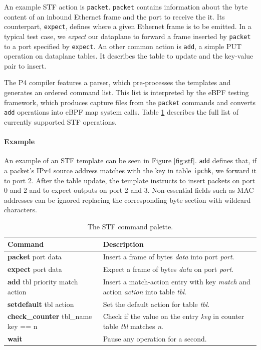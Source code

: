 An example STF action is \texttt{packet}. \texttt{packet} contains information 
about the byte content of an inbound Ethernet frame and the port to receive the 
it. Its counterpart, \texttt{expect}, defines where a given Ethernet frame is 
to be emitted. In a typical test case, we \textit{expect} our dataplane to 
forward a frame inserted by \texttt{packet} to a port specified by 
\texttt{expect}.
An other common action is \texttt{add}, a simple PUT operation 
on dataplane tables. It describes the table to update and the key-value pair 
to insert.

The P4 compiler features a parser, which pre-processes the templates and 
generates an ordered command list. This list is interpreted by the eBPF testing 
framework, which produces capture files from the \texttt{packet} commands and 
converts \texttt{add} operations into eBPF map system calls.
Table \ref{table:stf} describes the full list of currently 
supported STF operations.

\paragraph{Example}
An example of an STF template can be seen in Figure \ref{fig:stf}. \texttt{add} 
defines that, if a packet's IPv4 source address matches with the 
key in table \texttt{ipchk}, we forward it to port 2. After the table update, 
the template instructs to insert packets on port 0 and 2 and to expect outputs 
on port 2 and 3. Non-essential fields such as MAC addresses can be ignored 
replacing the corresponding byte section with wildcard characters.


\begin{table}[h]
	\begin{center}
		\begin{tabular}{|l|p{9cm}|} \hline
			\textbf{Command} & \textbf{Description} \\ \hline \hline
			\textbf{packet} port data & Insert a frame of bytes
			\textit{data} into port \textit{port}.    \\ \hline
			\textbf{expect} port data & Expect a frame of bytes
			\textit{data} on port \textit{port}.  \\ \hline
			\textbf{add} tbl priority match action & Insert a
			match-action entry with key \textit{match} and action
			\textit{action} into table \textit{tbl}. \\ \hline
			\textbf{setdefault} tbl action & Set the default action for table
			\textit{tbl}. \\
			\hline
			\textbf{check\_counter} tbl\_name key == n & Check if the value on
			the entry \textit{key} in counter table \textit{tbl} matches
			\textit{n}.  \\
			\hline
			\textbf{wait} & Pause any operation for a second. \\ \hline
		\end{tabular}
		\caption{The STF command palette.}\label{table:stf}
	\end{center}
\end{table}

